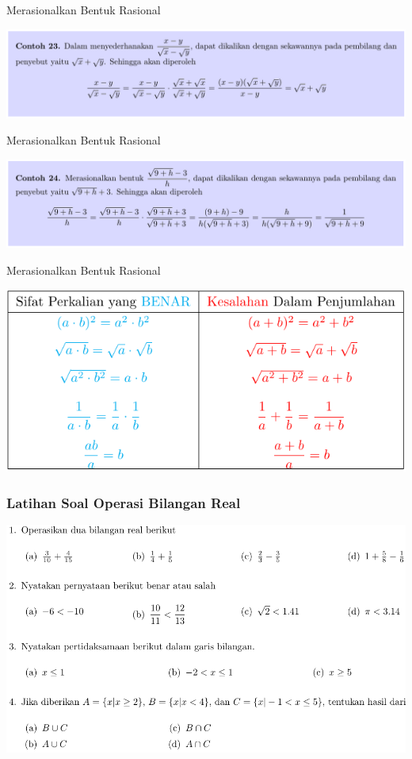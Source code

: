 \documentclass[pdflatex,compress,mathserif]{beamer}
\begin{document}
\begin{frame}{Merasionalkan Bentuk Rasional}
	\begin{center}
		\includegraphics[width=\linewidth]{img/img41}
	\end{center}
\end{frame}

\begin{frame}{Merasionalkan Bentuk Rasional}
	\begin{center}
		\includegraphics[width=\linewidth]{img/img42}
	\end{center}
\end{frame}

\begin{frame}{Merasionalkan Bentuk Rasional}
	\begin{center}
		\includegraphics[width=\linewidth]{img/img43}
	\end{center}
\end{frame}

\begin{frame}
	\frametitle{Latihan Soal Operasi Bilangan Real}
	\begin{center}
		\includegraphics[width=0.8\linewidth]{img/img44}
	\end{center}
\end{frame}
\end{document}
